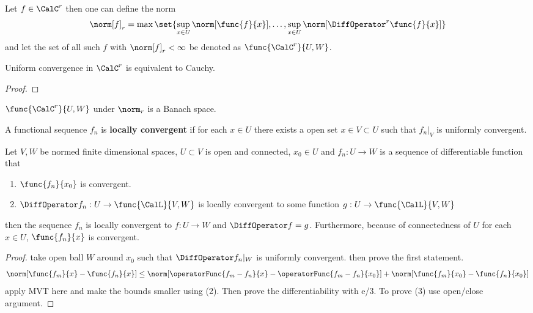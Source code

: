 Let \(f \in \CalC^r\) then one can define the norm
\begin{equation*}
    \norm[f]_r = \max \set{\sup_{x \in U}\norm[\func{f}{x}], \dots , \sup_{x \in U}\norm[\DiffOperator^r \func{f}{x}]}
\end{equation*}
and let the set of all such \(f\) with \(\norm[f]_r < \infty\) be denoted as \(\func{\CalC^r}{U,W}\).

\begin{theorem}
    Uniform convergence in \(\CalC^r\) is equivalent to Cauchy.
\end{theorem}

\begin{proof}

\end{proof}

\begin{theorem}
    \( \func{\CalC^r}{U,W}\) under \(\norm_r\) is a Banach space.
\end{theorem}


\begin{definition}
    A functional sequence \(f_n\) is \textbf{locally convergent} if for each \(x \in U\)  there exists a open set \(x \in V \subset U\) such that \(\left. f_n \right|_V\) is uniformly convergent.
\end{definition}

\begin{theorem}
    Let \(V,W\) be normed finite dimensional spaces, \(U \subset V\) is open and connected, \(x_0 \in U\) and \(f_n : U \to W\) is a sequence of differentiable function that
    \begin{enumerate}
        \item \(\func{f_n}{x_0}\) is convergent.
        \item \(\DiffOperator f_n : U \to \func{\CalL}{V,W}\) is locally convergent to some function \(g : U \to \func{\CalL}{V,W}\)
    \end{enumerate}
    then the sequence \(f_n\) is locally convergent to \(f : U \to W\) and \(\DiffOperator f = g\). Furthermore, because of connectedness of \(U\) for each \(x \in U\), \(\func{f_n}{x}\) is convergent.
\end{theorem}

\begin{proof}
    take open ball \(W\) around \(x_0\) such that \(\DiffOperator f_n|_W\) is uniformly convergent. then prove the first statement.
    \begin{equation*}
        \norm[\func{f_m}{x} - \func{f_n}{x}] \leq \norm[\operatorFunc{f_m - f_n}{x} - \operatorFunc{f_m - f_n}{x_0}] + \norm[\func{f_m}{x_0} - \func{f_n}{x_0}]
    \end{equation*}
    apply MVT here and make the bounds smaller using (2). Then prove the differentiability with e/3. To prove (3) use open/close argument.
\end{proof}


